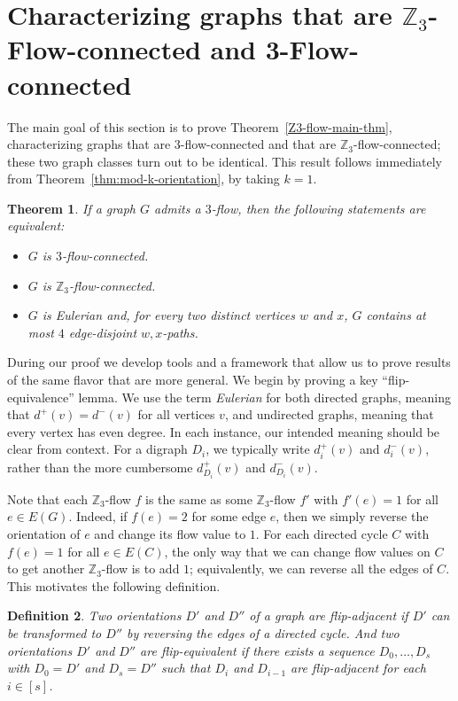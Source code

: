 \documentclass[a4paper,12pt]{article}
\theoremstyle{plain}
\newtheorem{theorem}{Theorem}[section]
\newtheorem{definition}[theorem]{Definition}
\theoremstyle{definition}
\newcommand{\Z}{\mathbb{Z}}
\begin{document}
\section{Characterizing graphs that are \texorpdfstring{$\Z_3$}{Z3}-Flow-connected and 3-Flow-connected}
\label{Z3-sec}

The main goal of this section is to prove Theorem~\ref{Z3-flow-main-thm}, characterizing graphs that are $3$-flow-connected and that are $\Z_3$-flow-connected; these two graph classes turn out to be identical.  This result follows immediately from 
Theorem~\ref{thm:mod-k-orientation}, by taking $k=1$.

\begin{theorem}\label{cor:3-flow}\label{Z3-flow-main-thm}
    If a graph $G$ admits a $3$-flow, 
    then the following statements are equivalent:
    \begin{itemize}
        \item $G$ is $3$-flow-connected.
        \item $G$ is $\Z_3$-flow-connected.
        \item $G$ is Eulerian and, for every two distinct vertices $w$ and $x$, $G$ contains at most $4$ 
		edge-disjoint $w,x$-paths.
    \end{itemize}
\end{theorem}

During our proof we develop tools and a framework that allow us to prove results of the same flavor that are more general. We begin by proving a key ``flip-equivalence'' lemma.
We use the term \emph{Eulerian} for both directed graphs, meaning that $d^+(v)=d^-(v)$ for all vertices $v$, and undirected graphs, meaning that every vertex has even degree. In each instance, our intended
meaning should be clear from context.
For a digraph $D_i$, we typically write $d^+_i(v)$ and $d^-_i(v)$, rather than the more cumbersome $d^+_{D_i}(v)$ and $d^-_{D_i}(v)$.


Note that each $\Z_3$-flow $f$ is the same as some $\Z_3$-flow $f'$ with $f'(e)=1$ for all $e\in E(G)$. Indeed, if $f(e)=2$ for some edge $e$, then we simply reverse the orientation of $e$ and change its flow value to $1$. For each directed cycle $C$ with $f(e)=1$ for all $e\in E(C)$, the only way that we can change flow values 
on $C$ to get another $\Z_3$-flow is to add $1$; equivalently, we can reverse all the edges of $C$. This motivates the following definition.

\begin{definition}
	Two orientations $D'$ and $D''$ of a graph are \emph{flip-adjacent} if $D'$ can be transformed
	to $D''$ by reversing the edges of a directed cycle. And two orientations $D'$ and $D''$ are 
	\emph{flip-equivalent} if there exists a sequence $D_0,\ldots,D_s$ with $D_0=D'$ and $D_s=D''$ such that $D_i$ and $D_{i-1}$ are flip-adjacent for each $i\in[s]$. 
\end{definition}
\end{document}
